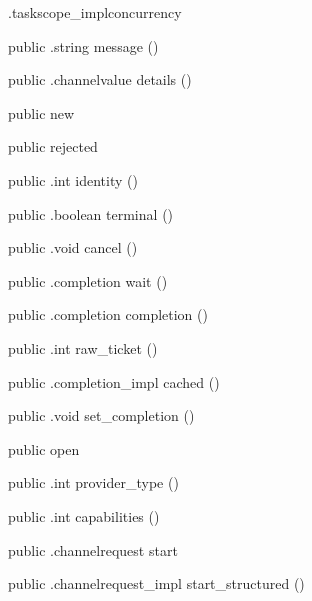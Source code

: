 \begin{CrexxClass}{.taskscope\_impl}{concurrency}
\begin{Members}
    \Method
      {public}
      {.string}
      {message}
      {()}

    \Method
      {public}
      {.channelvalue}
      {details}
      {()}

    \Factory
      {public}
      {new}
      {}

    \Factory
      {public}
      {rejected}
      {}

    \Method
      {public}
      {.int}
      {identity}
      {()}

    \Method
      {public}
      {.boolean}
      {terminal}
      {()}

    \Method
      {public}
      {.void}
      {cancel}
      {()}

    \Method
      {public}
      {.completion}
      {wait}
      {()}

    \Method
      {public}
      {.completion}
      {completion}
      {()}

    \Method
      {public}
      {.int}
      {raw\_ticket}
      {()}

    \Method
      {public}
      {.completion\_impl}
      {cached}
      {()}

    \Method
      {public}
      {.void}
      {set\_completion}
      {()}

    \Factory
      {public}
      {open}
      {}

    \Method
      {public}
      {.int}
      {provider\_type}
      {()}

    \Method
      {public}
      {.int}
      {capabilities}
      {()}

    \Method
      {public}
      {.channelrequest}
      {start}
      {}

    \Method
      {public}
      {.channelrequest\_impl}
      {start\_structured}
      {()}


\end{Members}
\end{CrexxClass}
